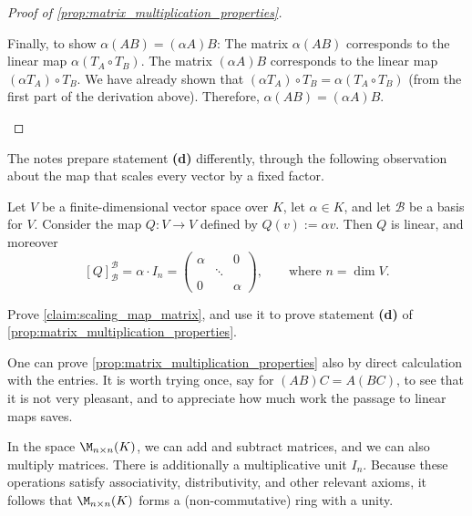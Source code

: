\begin{proof}[Proof of \cref{prop:matrix_multiplication_properties}]
\begin{enumerate}[label=\textbf{(\alph*)}]
    Finally, to show $\alpha(AB) = (\alpha A)B$:
    The matrix $\alpha(AB)$ corresponds to the linear map $\alpha(T_A \circ T_B)$.
    The matrix $(\alpha A)B$ corresponds to the linear map $(\alpha T_A) \circ T_B$.
    We have already shown that $(\alpha T_A) \circ T_B = \alpha (T_A \circ T_B)$ (from the first part of the derivation above).
    Therefore, $\alpha(AB) = (\alpha A)B$.
\end{enumerate}
\end{proof}

The notes prepare statement \textbf{(d)} differently, through the following observation about the map that scales every vector by a fixed factor.

\begin{claim}
\label{claim:scaling_map_matrix}
Let $V$ be a finite-di\-men\-sional vector space over $K$, let $\alpha \in K$, and let $\mathcal{B}$ be a basis for $V$. Consider the map $Q: V \to V$ defined by $Q(v) := \alpha v$. Then $Q$ is linear, and moreover
\[
[Q]_{\mathcal{B}}^{\mathcal{B}} = \alpha \cdot I_n = \begin{pmatrix} \alpha & & 0 \\ & \ddots & \\ 0 & & \alpha \end{pmatrix}, \qquad \text{where } n = \dim V.
\]
\end{claim}

\begin{exercise}
\label{exc:scaling_map_and_statement_d}
Prove \cref{claim:scaling_map_matrix}, and use it to prove statement \textbf{(d)} of \cref{prop:matrix_multiplication_properties}.
\end{exercise}

\begin{remark}
One can prove \cref{prop:matrix_multiplication_properties} also by direct calculation with the entries. It is worth trying once, say for $(AB)C = A(BC)$, to see that it is not very pleasant, and to appreciate how much work the passage to linear maps saves.
\end{remark}


\begin{remark}
\label{rem:matrix_ring}
In the space $\M_{n \times n}(K)$, we can add and subtract matrices, and we can also multiply matrices. There is additionally a multiplicative unit $I_n$. Because these operations satisfy associativity, distributivity, and other relevant axioms, it follows that $\M_{n \times n}(K)$ forms a (non-com\-mu\-ta\-tive) ring with a unity.
\end{remark}


